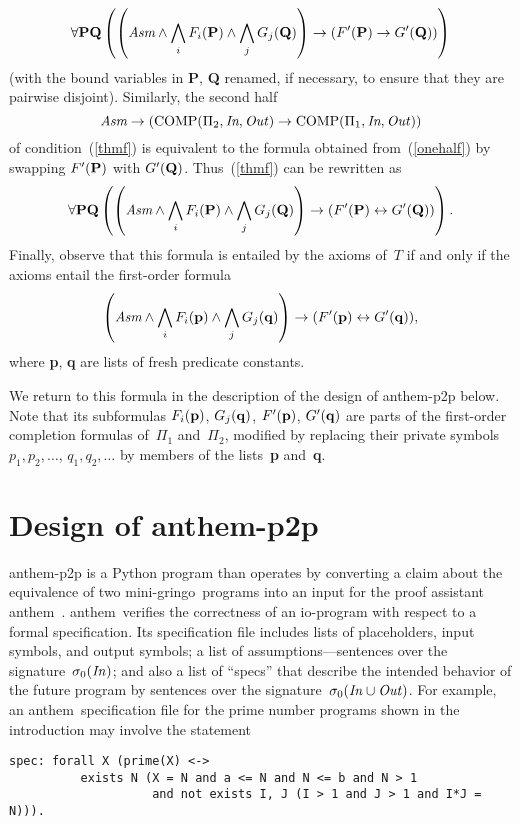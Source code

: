 \documentclass{new_tlp}
\def\lrar{\leftrightarrow}
\def\beq{\begin{equation}}
\def\eeq#1{\label{#1}\end{equation}}
\def\gringo{{\sc gringo}}
\def\anthem{{\sc anthem}}
\begin{document}
\beq
\forall {\bf PQ}\left(\left(
    \emph{Asm}\land\bigwedge_i F_i({\bf P}) 
\land\bigwedge_j G_j({\bf Q}) \right) \to (F'({\bf P})\to G'({\bf Q}))\right)
\eeq{onehalf}
(with the bound variables in {\bf P}, {\bf Q} renamed, if necessary, to ensure
that they are pairwise disjoint).
Similarly, the second half
$$%
\emph{Asm}\to(\hbox{COMP}(\Pi_2,\emph{In},\emph{Out\/}) \to
\hbox{COMP}(\Pi_1,\emph{In},\emph{Out\/}))
$$%
of condition~(\ref{thmf}) is equivalent to the formula obtained
from~(\ref{onehalf}) by swapping $F'({\bf P})$ with $G'({\bf Q})$.
Thus~(\ref{thmf}) can be rewritten as
$$
\forall {\bf PQ}\left(\left(
   \emph{Asm}\land\bigwedge_i F_i({\bf P}) 
   \land\bigwedge_j G_j({\bf Q}) \right) \to
          (F'({\bf P})\lrar G'({\bf Q}))\right).
$$
Finally, observe that this formula is entailed by the axioms of~$T$ if
and only if the axioms entail the first-order formula
\beq
\left(
    \emph{Asm}\land\bigwedge_i F_i({\bf p})
\land\bigwedge_j G_j({\bf q}) \right) \to (F'({\bf p})\lrar G'({\bf q})),
\eeq{thmffo}
where {\bf p}, {\bf q} are lists of fresh predicate constants.

We return to this formula in the description of the design of
{\sc anthem-p2p} below.  Note that its subformulas
$F_i({\bf p})$, $G_j({\bf q})$,
$F'({\bf p})$,
$G'({\bf q})$ are parts of the first-order completion
formulas of~$\Pi_1$ and~$\Pi_2$, modified by replacing their private symbols
$p_1,p_2,\dots$, $q_1,q_2,\dots$ by members of the lists~{\bf p} and~{\bf q}.

\section{Design of {\sc anthem-p2p}} \label{sec:ontop}

{\sc anthem-p2p} is a Python program than operates by converting a claim
about the equivalence of two mini-\gringo\ programs
into an input for the proof assistant \anthem\ \cite{fan20}.
\anthem\ verifies the correctness of an io-program with
respect to a formal specification.  Its specification file
includes lists of placeholders, input symbols, and
output symbols; a list of assumptions---sentences over the
signature~$\sigma_0(\emph{In\/})$; and also a list of ``specs''
that describe the intended behavior of the future program by sentences over the
signature~$\sigma_0(\emph{In\/}\cup\emph{Out\/})$.  For example, an
\anthem\ specification file for the prime number programs shown in the
introduction may involve the statement
\begin{verbatim}
spec: forall X (prime(X) <->
          exists N (X = N and a <= N and N <= b and N > 1
                    and not exists I, J (I > 1 and J > 1 and I*J = N))).
\end{verbatim}
\end{document}
